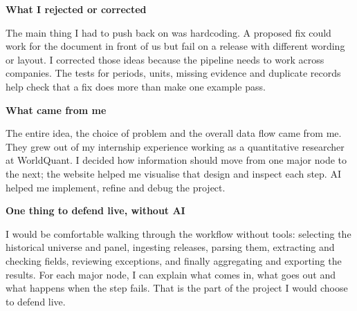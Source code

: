 \documentclass[10pt,a4paper]{article}
\newcommand{\smalltopic}[1]{\par\vspace{3pt}\textbf{#1}\par}
\begin{document}
\smalltopic{What I rejected or corrected}
The main thing I had to push back on was hardcoding. A proposed fix could work for the
document in front of us but fail on a release with different wording or layout. I
corrected those ideas because the pipeline needs to work across companies. The tests
for periods, units, missing evidence and duplicate records help check that a fix
does more than make one example pass.

\smalltopic{What came from me}
The entire idea, the choice of problem and the overall data flow came from me.
They grew out of my internship experience working as a quantitative researcher at
WorldQuant. I decided how information should move from one major node to the next;
the website helped me visualise that design and inspect each step. AI helped me
implement, refine and debug the project.

\smalltopic{One thing to defend live, without AI}
I would be comfortable walking through the workflow without tools: selecting the
historical universe and panel, ingesting releases, parsing them, extracting and
checking fields, reviewing exceptions, and finally aggregating and exporting the
results. For each major node, I can explain what comes in, what goes out and what
happens when the step fails. That is the part of the project I would choose to defend live.
\end{document}

